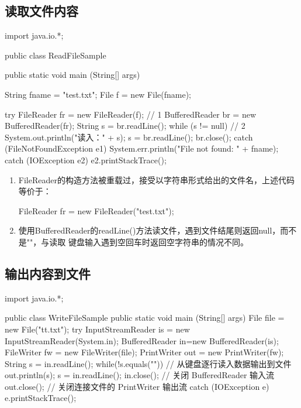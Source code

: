 \subsection{读取文件内容}


\begin{javaCode}
  import java.io.*;

  public class ReadFileSample {
    public static void main (String[] args) {
      String fname = "test.txt"; 
      File f = new File(fname);

      try {
        FileReader fr = new FileReader(f);  // 1
        BufferedReader br = new BufferedReader(fr); 
        String s = br.readLine();
        while (s != null) { // 2
          System.out.println("读入：" + s);
          s = br.readLine(); }
        br.close();
      } catch (FileNotFoundException e1) {
        System.err.println("File not found: " + fname); 
      } catch (IOException e2) {
        e2.printStackTrace(); 
      }
    } 
  }
\end{javaCode}


\begin{enumerate}
\item FileReader的构造方法被重载过，接受以字符串形式给出的文件名，上述代码等价于：
  \begin{javaCode}
    FileReader fr = new FileReader("test.txt");
  \end{javaCode}
\item 使用BufferedReader的readLine()方法读文件，遇到文件结尾则返回null，而不是""，与读取
  键盘输入遇到空回车时返回空字符串的情况不同。
\end{enumerate}


\subsection{输出内容到文件}


\begin{javaCode}
  import java.io.*;
  
  public class WriteFileSample {
    public static void main (String[] args) {
      File file = new File("tt.txt");
      try {
        InputStreamReader is = new InputStreamReader(System.in); 
        BufferedReader in=new BufferedReader(is);
        FileWriter fw = new FileWriter(file);
        PrintWriter out = new PrintWriter(fw);
        String s = in.readLine();
        while(!s.equals("")) { // 从键盘逐行读入数据输出到文件
          out.println(s);
          s = in.readLine(); 
        }
        in.close(); // 关闭 BufferedReader 输入流
        out.close(); // 关闭连接文件的 PrintWriter 输出流
      } catch (IOException e) {
        e.printStackTrace(); 
      }
    } 
  }
\end{javaCode}

